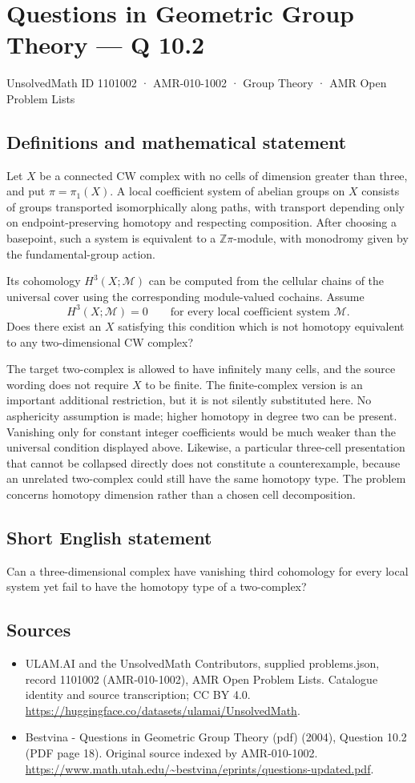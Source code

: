 \documentclass[11pt,a4paper]{article}
\begin{document}
\section*{Questions in Geometric Group Theory — Q 10.2}\label{1101002}
{\small UnsolvedMath ID 1101002 · AMR-010-1002 · Group Theory · AMR Open Problem Lists}
\subsection{Definitions and mathematical statement}
Let $X$ be a connected CW complex with no cells of dimension greater than three, and put $\pi=\pi_1(X)$. A local coefficient system of abelian groups on $X$ consists of groups transported isomorphically along paths, with transport depending only on endpoint-preserving homotopy and respecting composition. After choosing a basepoint, such a system is equivalent to a $\mathbb Z\pi$-module, with monodromy given by the fundamental-group action.

Its cohomology $H^3(X;\mathcal M)$ can be computed from the cellular chains of the universal cover using the corresponding module-valued cochains. Assume
\[
 H^3(X;\mathcal M)=0
 \qquad\text{for every local coefficient system }\mathcal M.
\]
Does there exist an $X$ satisfying this condition which is not homotopy equivalent to any two-dimensional CW complex?

The target two-complex is allowed to have infinitely many cells, and the source wording does not require $X$ to be finite. The finite-complex version is an important additional restriction, but it is not silently substituted here. No asphericity assumption is made; higher homotopy in degree two can be present. Vanishing only for constant integer coefficients would be much weaker than the universal condition displayed above. Likewise, a particular three-cell presentation that cannot be collapsed directly does not constitute a counterexample, because an unrelated two-complex could still have the same homotopy type. The problem concerns homotopy dimension rather than a chosen cell decomposition.
\subsection{Short English statement}
Can a three-dimensional complex have vanishing third cohomology for every local system yet fail to have the homotopy type of a two-complex?
\subsection{Sources}
\begin{itemize}
\item[S1] ULAM.AI and the UnsolvedMath Contributors, supplied problems.json, record 1101002 (AMR-010-1002), AMR Open Problem Lists. Catalogue identity and source transcription; CC BY 4.0.
\url{https://huggingface.co/datasets/ulamai/UnsolvedMath}.
\item[S2] Bestvina - Questions in Geometric Group Theory (pdf) (2004), Question 10.2 (PDF page 18). Original source indexed by AMR-010-1002.
\url{https://www.math.utah.edu/~bestvina/eprints/questions-updated.pdf}.
\end{itemize}
\end{document}

